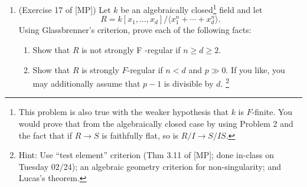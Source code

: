 \documentclass[11pt]{amsart}
\begin{document}
\begin{enumerate}[itemsep=7em]
\item (Exercise 17 of [MP]) Let $k$ be an algebraically closed\footnote{This problem is also true with the weaker hypothesis that $k$ is $F$-finite. You would prove that from the algebraically closed case by using Problem 2 and the fact that if $R\to S$ is faithfully flat, so is $R/I\to S/IS$.} 
field and let 
\[R = k[ x_1, \ldots , x_d]/\langle x^n_1 +\cdots + x^n_d \rangle.\] 
Using Glassbrenner's criterion, prove each of the following facts:
\begin{enumerate}[itemsep=1em]
\item Show that $R$
is not strongly F -regular if $n \ge d \ge 2$.
\item Show that $R$ is strongly $F$-regular if $n < d$ and $p \gg 0$. If you like, you may additionally assume that $p-1$ is divisible by $d$. \footnote{Hint: Use ``test element'' criterion (Thm 3.11 of [MP]; done in-class on Tuesday 02/24); an algebraic geometry criterion for non-singularity;  and Lucas's theorem.}
\end{enumerate}





\end{enumerate}
\end{document}
